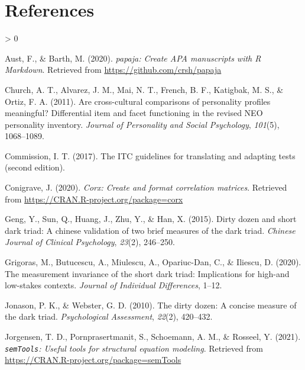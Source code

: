 \documentclass[
  english,
  man]{apa6}
\newlength{\cslhangindent}
\newenvironment{CSLReferences}[2] %
 {%
  \setlength{\parindent}{0pt}
  \ifodd #1 \everypar{\setlength{\hangindent}{\cslhangindent}}\ignorespaces\fi
  \ifnum #2 > 0
  \setlength{\parskip}{#2\baselineskip}
  \fi
 }%
 {}
\begin{document}
\hypertarget{references}{%
\section{References}\label{references}}

\begingroup
\setlength{\parindent}{-0.5in}
\setlength{\leftskip}{0.5in}

\hypertarget{refs}{}
\begin{CSLReferences}{1}{0}
\leavevmode\hypertarget{ref-R-papaja}{}%
Aust, F., \& Barth, M. (2020). \emph{{papaja}: {Create} {APA} manuscripts with {R Markdown}}. Retrieved from \url{https://github.com/crsh/papaja}

\leavevmode\hypertarget{ref-church2011cross}{}%
Church, A. T., Alvarez, J. M., Mai, N. T., French, B. F., Katigbak, M. S., \& Ortiz, F. A. (2011). Are cross-cultural comparisons of personality profiles meaningful? Differential item and facet functioning in the revised NEO personality inventory. \emph{Journal of Personality and Social Psychology}, \emph{101}(5), 1068--1089.

\leavevmode\hypertarget{ref-itc_2017}{}%
Commission, I. T. (2017). The ITC guidelines for translating and adapting tests (second edition).

\leavevmode\hypertarget{ref-R-corx}{}%
Conigrave, J. (2020). \emph{Corx: Create and format correlation matrices}. Retrieved from \url{https://CRAN.R-project.org/package=corx}

\leavevmode\hypertarget{ref-geng2015dirty}{}%
Geng, Y., Sun, Q., Huang, J., Zhu, Y., \& Han, X. (2015). Dirty dozen and short dark triad: A chinese validation of two brief measures of the dark triad. \emph{Chinese Journal of Clinical Psychology}, \emph{23}(2), 246--250.

\leavevmode\hypertarget{ref-grigoras2020measurement}{}%
Grigoras, M., Butucescu, A., Miulescu, A., Opariuc-Dan, C., \& Iliescu, D. (2020). The measurement invariance of the short dark triad: Implications for high-and low-stakes contexts. \emph{Journal of Individual Differences}, 1--12.

\leavevmode\hypertarget{ref-jonason2010dirty}{}%
Jonason, P. K., \& Webster, G. D. (2010). The dirty dozen: A concise measure of the dark triad. \emph{Psychological Assessment}, \emph{22}(2), 420--432.

\leavevmode\hypertarget{ref-R-semTools}{}%
Jorgensen, T. D., Pornprasertmanit, S., Schoemann, A. M., \& Rosseel, Y. (2021). \emph{\texttt{semTools}: {U}seful tools for structural equation modeling}. Retrieved from \url{https://CRAN.R-project.org/package=semTools}


\end{CSLReferences}
\end{document}
